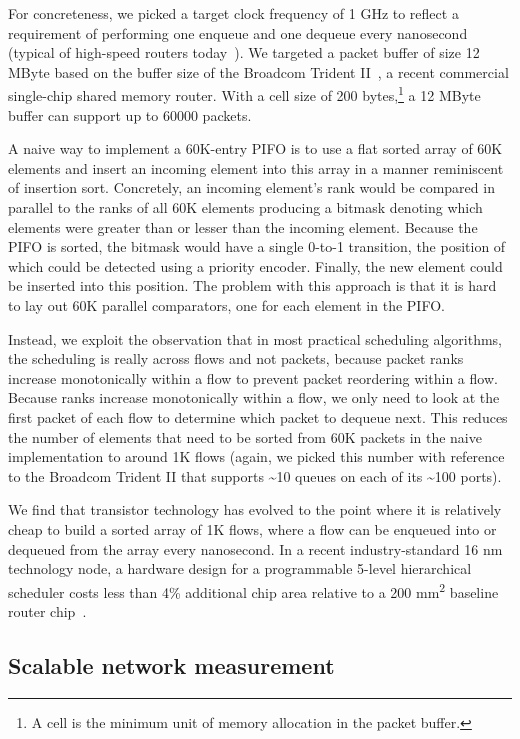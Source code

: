 For concreteness, we picked a target clock frequency of 1 GHz to reflect a
requirement of performing one enqueue and one dequeue every nanosecond (typical
of high-speed routers today~\cite{rmt}). We targeted a packet buffer of size 12
MByte based on the buffer size of the Broadcom Trident
II~\cite{trident2_buffer}, a recent commercial single-chip shared memory
router. With a cell size of 200 bytes,\footnote{A cell is the minimum unit of
memory allocation in the packet buffer.} a 12 MByte buffer can support up to
60000 packets.

A naive way to implement a 60K-entry PIFO is to use a flat sorted array of 60K
elements and insert an incoming element into this array in a manner reminiscent
of insertion sort. Concretely, an incoming element's rank would be compared in
parallel to the ranks of all 60K elements producing a bitmask denoting which
elements were greater than or lesser than the incoming element. Because the
PIFO is sorted, the bitmask would have a single 0-to-1 transition, the position
of which could be detected using a priority encoder. Finally, the new element
could be inserted into this position. The problem with this approach is that it
is hard to lay out 60K parallel comparators, one for each element in the PIFO.

Instead, we exploit the observation that in most practical scheduling
algorithms, the scheduling is really across flows and not packets, because
packet ranks increase monotonically within a flow to prevent packet reordering
within a flow. Because ranks increase monotonically within a flow, we only need
to look at the first packet of each flow to determine which packet to dequeue
next. This reduces the number of elements that need to be sorted from 60K
packets in the naive implementation to around 1K flows (again, we picked this
number with reference to the Broadcom Trident II that supports \textasciitilde10 queues
on each of its \textasciitilde100 ports).

We find that transistor technology has evolved to the point where it is
relatively cheap to build a sorted array of 1K flows, where a flow can be
enqueued into or dequeued from the array every nanosecond. In a recent
industry-standard 16 nm technology node, a hardware design for a programmable
5-level hierarchical scheduler costs less than 4\% additional chip area
relative to a 200 \si{\milli\meter\squared} baseline router
chip~\cite{glen_parsing}.

\subsection{Scalable network measurement}

